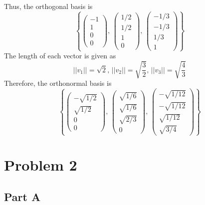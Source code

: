 \documentclass{article}
\begin{document}
Thus, the orthogonal basis is
$$ \left\{ \begin{pmatrix}
    -1 \\
    1 \\
    0 \\
    0
\end{pmatrix},\, \begin{pmatrix}
    1/2 \\
    1/2 \\
    1 \\
    0
\end{pmatrix},\, \begin{pmatrix}
    -1/3 \\
    -1/3 \\
    1/3 \\
    1
\end{pmatrix} \right\} $$
The length of each vector is given as
$$ || v_1 || = \sqrt{2},\, || v_2 || = \sqrt{\frac{3}{2}},\, || v_3 || =
\sqrt{\frac{4}{3}} $$
Therefore, the orthonormal basis is
$$ \left\{ \begin{pmatrix}
    -\sqrt{1/2} \\
    \sqrt{1/2} \\
    0 \\
    0
\end{pmatrix},\, \begin{pmatrix}
    \sqrt{1/6} \\
    \sqrt{1/6} \\
    \sqrt{2/3} \\
    0
\end{pmatrix},\, \begin{pmatrix}
    -\sqrt{1/12} \\
    -\sqrt{1/12} \\
    \sqrt{1/12} \\
    \sqrt{3/4}
\end{pmatrix} \right\} $$

\section*{Problem 2}

\subsection*{Part A}
\end{document}
